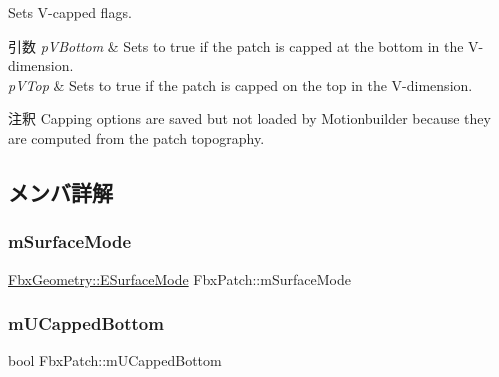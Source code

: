 Sets V-\/capped flags. 
\begin{DoxyParams}{引数}
{\em p\+V\+Bottom} & Sets to {\ttfamily true} if the patch is capped at the bottom in the V-\/dimension. \\
\hline
{\em p\+V\+Top} & Sets to {\ttfamily true} if the patch is capped on the top in the V-\/dimension. \\
\hline
\end{DoxyParams}
\begin{DoxyRemark}{注釈}
Capping options are saved but not loaded by Motionbuilder because they are computed from the patch topography. 
\end{DoxyRemark}


\subsection{メンバ詳解}
\mbox{\label{class_fbx_patch_abad06185040d5492cf5731e9ff80fee6}} 
\subsubsection{\texorpdfstring{m\+Surface\+Mode}{mSurfaceMode}}
{\footnotesize\ttfamily \hyperlink{class_fbx_geometry_adb9d2e34481a2cb40f1d783c665794db}{Fbx\+Geometry\+::\+E\+Surface\+Mode} Fbx\+Patch\+::m\+Surface\+Mode\hspace{0.3cm}{\ttfamily [protected]}}

\mbox{\label{class_fbx_patch_ace54e1a6eabcb3c3f8ca80a577e614bb}} 
\subsubsection{\texorpdfstring{m\+U\+Capped\+Bottom}{mUCappedBottom}}
{\footnotesize\ttfamily bool Fbx\+Patch\+::m\+U\+Capped\+Bottom\hspace{0.3cm}{\ttfamily [protected]}}

\mbox{\label{class_fbx_patch_ae1ddc8b790090533b61a3d432e776f96}} 
